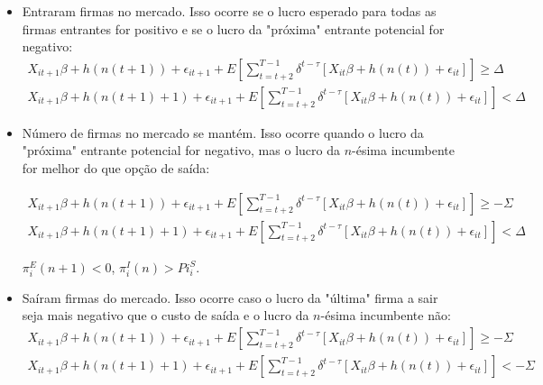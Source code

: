\documentclass{article}
\begin{document}
\begin{itemize}
    \item Entraram firmas no mercado. Isso ocorre se o lucro esperado para todas as firmas entrantes for positivo e se o lucro da "próxima" entrante potencial for negativo: 
\begin{equation*}
\begin{aligned}
  X_{it+1}\beta + h(n(t+1)) + \epsilon_{it+1} + E\left[\sum_{t=t+2}^{T-1} \delta^{t-\tau}[X_{it}\beta + h(n(t)) + \epsilon_{it}] \right] \geq \Delta\\
    X_{it+1}\beta + h(n(t+1)+1) + \epsilon_{it+1} + E\left[\sum_{t=t+2}^{T-1} \delta^{t-\tau}[X_{it}\beta + h(n(t)) + \epsilon_{it}] \right] < \Delta
\end{aligned}
\end{equation*}
    
    \item Número de firmas no mercado se mantém. Isso ocorre quando o lucro da "próxima" entrante potencial for negativo, mas o lucro da $n$-ésima incumbente for melhor do que opção de saída: 

\begin{equation*}
\begin{aligned}
  X_{it+1}\beta + h(n(t+1)) + \epsilon_{it+1} + E\left[\sum_{t=t+2}^{T-1} \delta^{t-\tau}[X_{it}\beta + h(n(t)) + \epsilon_{it}] \right] \geq -\Sigma\\
    X_{it+1}\beta + h(n(t+1)+1) + \epsilon_{it+1} + E\left[\sum_{t=t+2}^{T-1} \delta^{t-\tau}[X_{it}\beta + h(n(t)) + \epsilon_{it}] \right] < \Delta
\end{aligned}
\end{equation*}
    
    $\pi_i^E(n+1)<0$, $\pi_i^I(n)>Pi_i^S$.
    \item Saíram firmas do mercado. Isso ocorre caso o lucro da "última" firma a sair seja mais negativo que o custo de saída e o lucro da $n$-ésima incumbente não:
\begin{equation*}
\begin{aligned}
    X_{it+1}\beta + h(n(t+1)) + \epsilon_{it+1} + E\left[\sum_{t=t+2}^{T-1} \delta^{t-\tau}[X_{it}\beta + h(n(t)) + \epsilon_{it}] \right] \geq -\Sigma\\
    X_{it+1}\beta + h(n(t+1)+1) + \epsilon_{it+1} + E\left[\sum_{t=t+2}^{T-1} \delta^{t-\tau}[X_{it}\beta + h(n(t)) + \epsilon_{it}] \right] < -\Sigma
\end{aligned}
\end{equation*}
    
\end{itemize}
\end{document}
